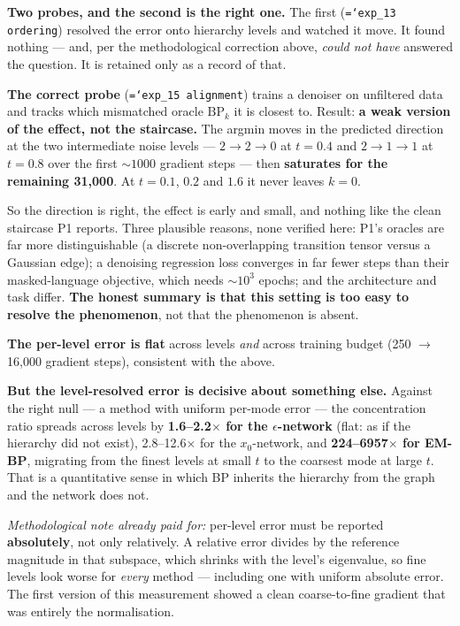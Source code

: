\documentclass[11pt,a4paper]{article}
\newcommand{\code}[1]{\texttt{\small\hyphenchar\font=`\-\relax #1}}
\begin{document}
\textbf{Two probes, and the second is the right one.} The first
(\code{exp\_13 ordering}) resolved the error onto hierarchy levels and watched it move. It
found nothing --- and, per the methodological correction above, \emph{could not have} answered
the question. It is retained only as a record of that.

\textbf{The correct probe} (\code{exp\_15 alignment}) trains a denoiser on unfiltered data and
tracks which mismatched oracle $\mathrm{BP}_k$ it is closest to. Result: \textbf{a weak
version of the effect, not the staircase.} The argmin moves in the predicted direction at the
two intermediate noise levels --- $2\to2\to0$ at $t=0.4$ and $2\to1\to1$ at $t=0.8$ over the
first ${\sim}1000$ gradient steps --- then \textbf{saturates for the remaining 31{,}000}. At
$t=0.1$, $0.2$ and $1.6$ it never leaves $k=0$.

So the direction is right, the effect is early and small, and nothing like the clean staircase
P1 reports. Three plausible reasons, none verified here: P1's oracles are far more
distinguishable (a discrete non-overlapping transition tensor versus a Gaussian edge); a
denoising regression loss converges in far fewer steps than their masked-language objective,
which needs ${\sim}10^3$ epochs; and the architecture and task differ.
\textbf{The honest summary is that this setting is too easy to resolve the phenomenon}, not
that the phenomenon is absent.

\medskip
\textbf{The per-level error is flat} across levels \emph{and} across training budget
(250 $\to$ 16{,}000 gradient steps), consistent with the above.

\textbf{But the level-resolved error is decisive about something else.} Against the right
null --- a method with uniform per-mode error --- the concentration ratio spreads across
levels by \textbf{1.6--2.2$\times$ for the $\epsilon$-network} (flat: as if the hierarchy did
not exist), 2.8--12.6$\times$ for the $x_0$-network, and \textbf{224--6957$\times$ for
EM-BP}, migrating from the finest levels at small $t$ to the coarsest mode at large $t$.
That is a quantitative sense in which BP inherits the hierarchy from the graph and the
network does not.

\emph{Methodological note already paid for:} per-level error must be reported
\textbf{absolutely}, not only relatively. A relative error divides by the reference magnitude
in that subspace, which shrinks with the level's eigenvalue, so fine levels look worse for
\emph{every} method --- including one with uniform absolute error. The first version of this
measurement showed a clean coarse-to-fine gradient that was entirely the normalisation.
\end{document}
